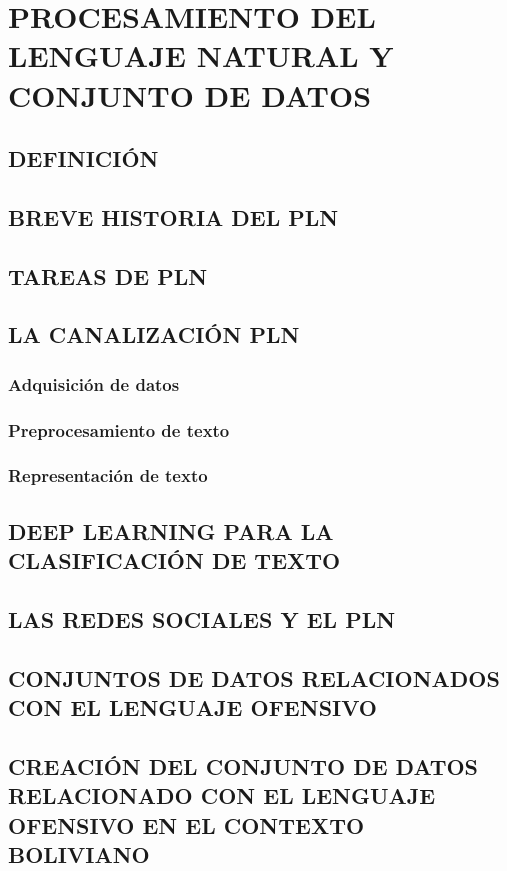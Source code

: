 \chapter{PROCESAMIENTO DEL LENGUAJE NATURAL Y CONJUNTO DE DATOS}\label{chp-controlIoT}

\section{DEFINICIÓN}

\section{BREVE HISTORIA DEL PLN}

\section{TAREAS DE PLN}

\section{LA CANALIZACIÓN PLN}

\subsection{Adquisición de datos}

\subsection{Preprocesamiento de texto}

\subsection{Representación de texto}

\section{DEEP LEARNING PARA LA CLASIFICACIÓN DE TEXTO}

\section{LAS REDES SOCIALES Y EL PLN}

\section{CONJUNTOS DE DATOS RELACIONADOS CON EL LENGUAJE OFENSIVO}

\section{CREACIÓN DEL CONJUNTO DE DATOS RELACIONADO CON EL LENGUAJE OFENSIVO EN EL CONTEXTO BOLIVIANO}

